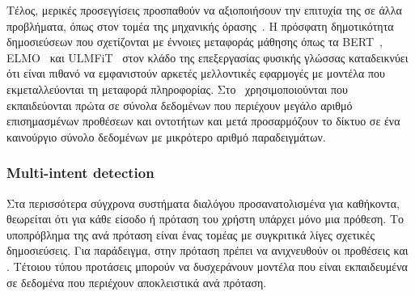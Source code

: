 Τέλος, μερικές προσεγγίσεις προσπαθούν να αξιοποιήσουν την επιτυχία της  σε άλλα προβλήματα,
όπως στον τομέα της μηχανικής όρασης~\cite{sharif2014cnn,girshick2014rich,donahue2014decaf}.
Η πρόσφατη δημοτικότητα δημοσιεύσεων που σχετίζονται με έννοιες μεταφοράς μάθησης όπως τα BERT~\cite{bert}, ELMO~\cite{elmo} και ULMFiT~\cite{ulmfit} στον κλάδο της επεξεργασίας φυσικής γλώσσας
καταδεικνύει ότι είναι πιθανό να εμφανιστούν αρκετές μελλοντικές εφαρμογές με μοντέλα που εκμεταλλεύονται τη μεταφορά πληροφορίας.
Στο~\cite{goyal2018fast} χρησιμοποιούνται
που εκπαιδεύονται πρώτα σε σύνολα δεδομένων που περιέχουν μεγάλο αριθμό επισημασμένων προθέσεων και οντοτήτων και μετά προσαρμόζουν το δίκτυο σε ένα καινούργιο σύνολο δεδομένων με μικρότερο αριθμό παραδειγμάτων.

\subsubsection{Multi-intent detection}\label{subsec:multi-intent}
Στα περισσότερα σύγχρονα συστήματα διαλόγου προσανατολισμένα για καθήκοντα, θεωρείται ότι για κάθε είσοδο ή πρόταση του χρήστη υπάρχει μόνο μια πρόθεση.
Το υποπρόβλημα της
ανά πρόταση είναι ένας τομέας με συγκριτικά λίγες σχετικές δημοσιεύσεις.
Για παράδειγμα, στην πρόταση  πρέπει να ανιχνευθούν οι προθέσεις  και .
Τέτοιου τύπου προτάσεις μπορούν να δυσχεράνουν μοντέλα που είναι εκπαιδευμένα σε δεδομένα που περιέχουν αποκλειστικά  ανά πρόταση.

